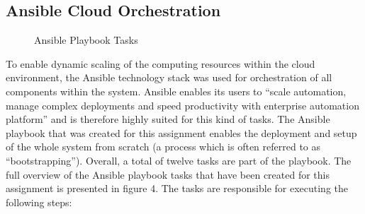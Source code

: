 \documentclass[11pt, oneside]{article}
\begin{document}
\subsection{Ansible Cloud Orchestration}
\begin{figure}
  \begin{center}
  \end{center}
  \label{fig:ansible_playbook_tasks}
  \caption{Ansible Playbook Tasks}
\end{figure}
To enable dynamic scaling of the computing resources within the cloud environment, the Ansible technology stack was used for orchestration of all components within the system. Ansible enables its users to \enquote{scale automation, manage complex deployments and speed productivity with enterprise automation platform} \citep{ansible} and is therefore highly suited for this kind of tasks. 
\newline
The Ansible playbook that was created for this assignment enables the deployment and setup of the whole system from scratch (a process which is often referred to as \enquote{bootstrapping}). Overall, a total of twelve tasks are part of the playbook. The full overview of the Ansible playbook tasks that have been created for this assignment is presented in figure 4.
\newline
The tasks are responsible for executing the following steps:
\vspace{5pt}
\newline
\vspace{5pt}
\end{document}
